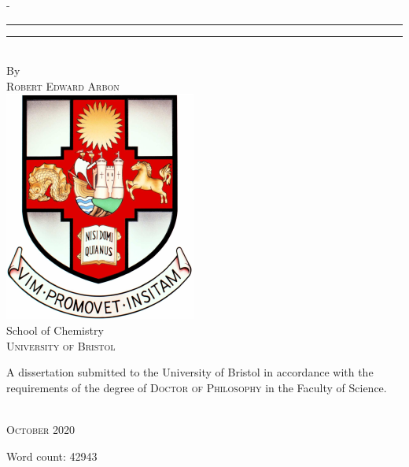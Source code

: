 \begin{titlingpage}
\begin{SingleSpace}
\begin{adjustwidth*}{\unitlength}{-\unitlength}
\begin{center}
\rule[0.5ex]{\linewidth}{1pt}\vspace*{-\baselineskip}\vspace{3.2pt}
\rule[0.5ex]{\linewidth}{2pt}\\
\vspace{6.5mm}
{\large By}\\
\vspace{6.5mm}
{\large\textsc{Robert Edward Arbon}}\\
\vspace{11mm}
\includegraphics[scale=0.6]{logos/bristolcrest_colour}\\
\vspace{6mm}
{\large School of Chemistry\\
\textsc{University of Bristol}}\\
\vspace{11mm}
\begin{minipage}{10cm}
A dissertation submitted to the University of Bristol in accordance with the requirements of the degree of \textsc{Doctor of Philosophy} in the Faculty of Science.
\end{minipage}\\
\vspace{9mm}
{\large\textsc{October 2020}}
\vspace{12mm}
\end{center}
\begin{flushright}
{\small Word count: 42943}
\end{flushright}
\end{adjustwidth*}
\end{SingleSpace}
\end{titlingpage}